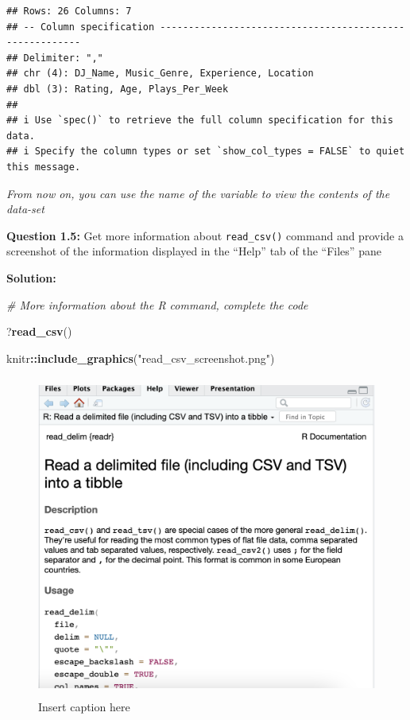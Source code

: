 \documentclass[
]{article}
\newenvironment{Shaded}{\begin{snugshade}}{\end{snugshade}}
\newcommand{\CommentTok}[1]{\textcolor[rgb]{0.56,0.35,0.01}{\textit{#1}}}
\newcommand{\FunctionTok}[1]{\textcolor[rgb]{0.13,0.29,0.53}{\textbf{#1}}}
\newcommand{\NormalTok}[1]{#1}
\newcommand{\SpecialCharTok}[1]{\textcolor[rgb]{0.81,0.36,0.00}{\textbf{#1}}}
\newcommand{\StringTok}[1]{\textcolor[rgb]{0.31,0.60,0.02}{#1}}
\begin{document}
\begin{verbatim}
## Rows: 26 Columns: 7
## -- Column specification --------------------------------------------------------
## Delimiter: ","
## chr (4): DJ_Name, Music_Genre, Experience, Location
## dbl (3): Rating, Age, Plays_Per_Week
## 
## i Use `spec()` to retrieve the full column specification for this data.
## i Specify the column types or set `show_col_types = FALSE` to quiet this message.
\end{verbatim}

\emph{From now on, you can use the name of the variable to view the
contents of the data-set}

\textbf{Question 1.5:} Get more information about \texttt{read\_csv()}
command and provide a screenshot of the information displayed in the
``Help'' tab of the ``Files'' pane

\textbf{Solution:}

\begin{Shaded}
\begin{Highlighting}[]
\CommentTok{\# More information about the R command, complete the code}

\NormalTok{?}\FunctionTok{read\_csv}\NormalTok{()}
\end{Highlighting}
\end{Shaded}

\begin{Shaded}
\begin{Highlighting}[]
\NormalTok{knitr}\SpecialCharTok{::}\FunctionTok{include\_graphics}\NormalTok{(}\StringTok{"read\_csv\_screenshot.png"}\NormalTok{)}
\end{Highlighting}
\end{Shaded}

\begin{figure}
\includegraphics[width=800px,height=400px]{read_csv_screenshot} \caption{Insert caption here}\label{fig:unnamed-chunk-5}
\end{figure}
\end{document}
